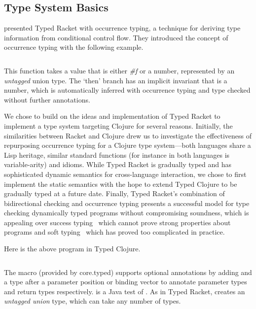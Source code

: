 \subsection{Type System Basics}


\citet{TF10}
presented Typed Racket with occurrence typing,
a technique for deriving type information from conditional control flow.
They introduced the concept of occurrence typing 
with the following example.

\inputminted[firstline=3]{racket}{code/tr/example1.rkt}

This function takes a value that is either \emph{\#f} %
or a number, represented by an \emph{untagged} union type.
The `then' branch has an implicit invariant
that  is a number, which is automatically inferred with occurrence typing
and type checked without further annotations.

We chose to build on the ideas and implementation
of Typed Racket to implement a type system targeting Clojure for several reasons.
Initially, the similarities between Racket and Clojure drew us to
investigate the effectiveness of repurposing occurrence typing
for a Clojure type system---both languages share a Lisp heritage,
similar standard functions 
(for instance 
in both languages is variable-arity)
and idioms.
While Typed Racket is gradually typed and has sophisticated
dynamic semantics for cross-language interaction, we 
chose to first implement
the static semantics
with the hope to extend Typed Clojure to be gradually typed at a future date.
Finally,
Typed Racket's combination of bidirectional checking
and occurrence typing presents a successful model for 
type checking dynamically typed programs without compromising
soundness, which is appealing over success typing~\cite{Lindahl:2006:PTI}
which cannot prove strong properties about programs
and soft typing~\cite{CF91}
which has proved too complicated in practice.

Here is the above program in Typed Clojure.
\begin{exmp}
\inputminted[firstline=5]{clojure}{code/demo/src/demo/eg1.clj}
\label{example:conditionalflow}
\end{exmp}

The  macro (provided by core.typed) supports optional annotations by 
adding
\clj{:-} and a type after a parameter
position
or binding vector 
to annotate parameter types
and return types respectively.
 is
a Java  test of .
As in Typed Racket,  creates an \emph{untagged union} type, which can take
any number of types.

